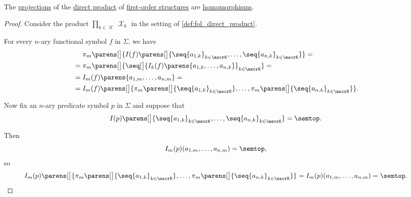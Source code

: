 \begin{proposition}\label{thm:fol_direct_product_projections}
  The \hyperref[def:cartesian_product_projection]{projections} of the \hyperref[def:fol_direct_product]{direct product} of \hyperref[def:fol_structure]{first-order structures} are \hyperref[def:fol_homomorphism]{homomorphisms}.
\end{proposition}
\begin{proof}
  Consider the product \( \prod_{k \in \mscrK} \mscrX_k \) in the setting of \cref{def:fol_direct_product}.

   For every \( n \)-ary functional symbol \( f \) in \( \Sigma \), we have
  \begin{align*}
    &\phantom{{}={}}
    \pi_m\parens[\big]{ I(f)\parens[\big]{ \seq{ a_{1,k} }_{k \in \mscrK}, \ldots, \seq{ a_{n,k} }_{k \in \mscrK} } }
    = \\ &=
    \pi_m\parens[\big]{ \seq[\big]{ I_k(f)\parens{ a_{1,k}, \ldots, a_{n,k} } }_{k \in \mscrK} }
    = \\ &=
    I_m(f)\parens{ a_{1,m}, \ldots, a_{n,m} }
    = \\ &=
    I_m(f)\parens[\big]{ \pi_m\parens[\big]{ \seq{ a_{1,k} }_{k \in \mscrK} }, \ldots, \pi_m\parens[\big]{ \seq{ a_{n,k} }_{k \in \mscrK} } }.
  \end{align*}

   Now fix an \( n \)-ary predicate symbol \( p \) in \( \Sigma \) and suppose that
  \begin{equation*}
    I(p)\parens[\big]{ \seq{ a_{1,k} }_{k \in \mscrK}, \ldots, \seq{ a_{n,k} }_{k \in \mscrK} } = \semtop.
  \end{equation*}

  Then
  \begin{equation*}
    I_m(p)(a_{1,m}, \ldots, a_{n,m}) = \semtop,
  \end{equation*}
  so
  \begin{equation*}
    I_m(p)\parens[\big]{ \pi_m\parens[\big]{ \seq{ a_{1,k} }_{k \in \mscrK} }, \ldots, \pi_m\parens[\big]{ \seq{ a_{n,k} }_{k \in \mscrK} } }
    =
    I_m(p)(a_{1,m}, \ldots, a_{n,m})
    =
    \semtop.
  \end{equation*}
\end{proof}

